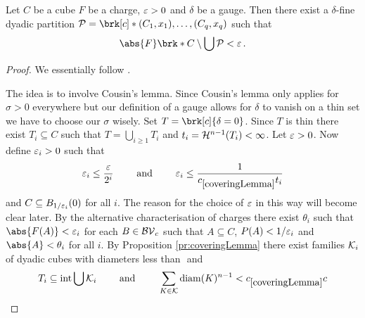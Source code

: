 \begin{lemma}\label{le:DisjointCube}
Let $C$ be a cube $F$ be a charge, $\varepsilon>0$ and $\delta$ be a gauge. Then there exist a $\delta$-fine dyadic partition $\cP=\brk[c]*{(C_1,x_1),\dots,(C_q,x_q)}$ such that
\begin{align*}
	\abs{F}\brk*{C\setminus\bigcup\cP}<\e\,.
\end{align*}
\end{lemma}
\begin{proof}

We essentially follow \cite[Lemma 2.6.4]{Pfe2001}.

The idea is to involve Cousin's lemma. Since Cousin's lemma only applies for $\sigma>0$ everywhere but our definition of a gauge allows for $\delta$ to vanish on a thin set we have to choose our $\sigma$ wisely.
Set $T=\brk[c]{\delta=0}$. Since $T$ is thin there exist $T_i\subseteq C$ such that $T=\bigcup_{i\geq1}T_i$ and $t_i=\mathcal{H}^{n-1}(T_i)<\infty$.
Let $\varepsilon>0$. 
Now define $\varepsilon_i>0$ such that
\begin{align*}
	\e_i\leq \frac{\e}{2^i}\qquad\text{ and }\qquad\e_i\leq \frac{1}{\useconstant{coveringLemma}t_i}
\end{align*}
and $C\subseteq B_{1/\varepsilon_i}(0)$ for all $i$. The reason for the choice of $\varepsilon$ in this way will become clear later.
By the alternative characterisation of charges there exist $\theta_i$ such that $\abs{F(A)}<\e_i$ for each $B\in\mathcal{BV}_c$ such that $A\subseteq C$, $P(A)<1/\varepsilon_i$ and $\abs{A}<\theta_i$ for all $i$.
By Proposition \ref{pr:coveringLemma} there exist families $\mathcal{K}_i$ of dyadic cubes with diameters less than $ $ and 
\begin{align*}
	T_i\subseteq \interiour\bigcup\cK_i
	\qquad\text{ and }\qquad
	\sum_{K\in\cK}\diam(K)^{n-1}<\useconstant{coveringLemma} c
\end{align*}


\end{proof}
